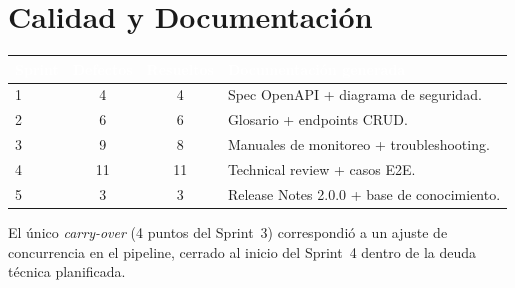 \section{Calidad y Documentación}
\label{sec:anexo_metricas_calidad}
\renewcommand{\arraystretch}{1.3}
\fontsize{9}{10.8}\selectfont\sffamily
\noindent
\begin{tabularx}{\textwidth}{|l|c|c|X|}
\hline
\rowcolor{colorPrimario}
\textcolor{white}{\textbf{Sprint}} & \textcolor{white}{\textbf{Defectos}} & \textcolor{white}{\textbf{Resueltos}} & \textcolor{white}{\textbf{Documentación generada}} \\ \hline
1 & 4 & 4 & Spec OpenAPI + diagrama de seguridad. \\ \hline
\rowcolor{grisTecnico}
2 & 6 & 6 & Glosario + endpoints CRUD. \\ \hline
3 & 9 & 8 & Manuales de monitoreo + troubleshooting. \\ \hline
\rowcolor{grisTecnico}
4 & 11 & 11 & Technical review + casos E2E. \\ \hline
5 & 3 & 3 & Release Notes 2.0.0 + base de conocimiento. \\ \hline
\end{tabularx}\normalfont\normalsize
\par\vspace{0.3cm}

\begin{NotaTecnica}
El único \textit{carry-over} (4 puntos del Sprint~3) correspondió a un ajuste de concurrencia en
el pipeline, cerrado al inicio del Sprint~4 dentro de la deuda técnica planificada.
\end{NotaTecnica}

\clearpage
